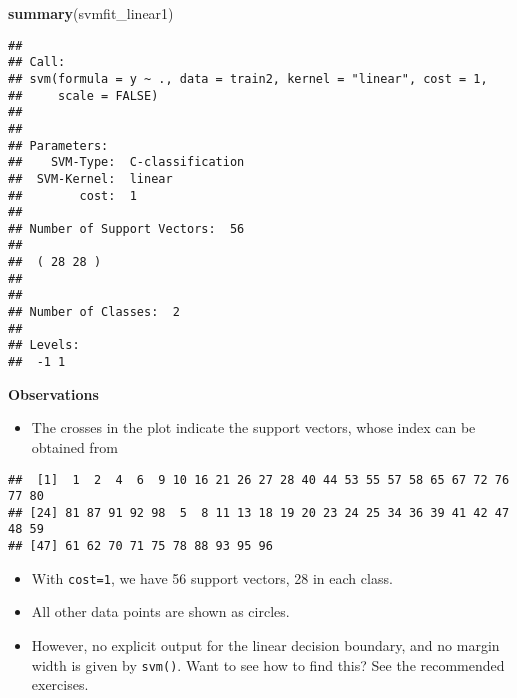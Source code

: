 \documentclass[10pt,ignorenonframetext,]{beamer}
\newenvironment{Shaded}{\begin{snugshade}}{\end{snugshade}}
\newcommand{\CommentTok}[1]{\textcolor[rgb]{0.56,0.35,0.01}{\textit{#1}}}
\newcommand{\KeywordTok}[1]{\textcolor[rgb]{0.13,0.29,0.53}{\textbf{#1}}}
\newcommand{\NormalTok}[1]{#1}
\newcommand{\OperatorTok}[1]{\textcolor[rgb]{0.81,0.36,0.00}{\textbf{#1}}}
\providecommand{\tightlist}{%
  \setlength{\itemsep}{0pt}\setlength{\parskip}{0pt}}
\begin{document}
\begin{frame}[fragile]

\scriptsize

\begin{Shaded}
\begin{Highlighting}[]
\KeywordTok{summary}\NormalTok{(svmfit_linear1)}
\end{Highlighting}
\end{Shaded}

\begin{verbatim}
## 
## Call:
## svm(formula = y ~ ., data = train2, kernel = "linear", cost = 1, 
##     scale = FALSE)
## 
## 
## Parameters:
##    SVM-Type:  C-classification 
##  SVM-Kernel:  linear 
##        cost:  1 
## 
## Number of Support Vectors:  56
## 
##  ( 28 28 )
## 
## 
## Number of Classes:  2 
## 
## Levels: 
##  -1 1
\end{verbatim}

\normalsize

\end{frame}

\begin{frame}[fragile]

\textbf{Observations}

\begin{itemize}
\tightlist
\item
  The crosses in the plot indicate the support vectors, whose index can
  be obtained from
\end{itemize}

\vspace{2mm}

\scriptsize

\begin{Shaded}
\end{Shaded}

\begin{verbatim}
##  [1]  1  2  4  6  9 10 16 21 26 27 28 40 44 53 55 57 58 65 67 72 76 77 80
## [24] 81 87 91 92 98  5  8 11 13 18 19 20 23 24 25 34 36 39 41 42 47 48 59
## [47] 61 62 70 71 75 78 88 93 95 96
\end{verbatim}

\normalsize

\begin{itemize}
\item
  With \texttt{cost=1}, we have 56 support vectors, 28 in each class.
\item
  All other data points are shown as circles.
\item
  However, no explicit output for the linear decision boundary, and no
  margin width is given by \texttt{svm()}. Want to see how to find this?
  See the recommended exercises.
\end{itemize}

\end{frame}
\end{document}
